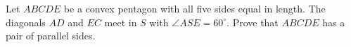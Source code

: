 Let $ABCDE$ be a convex pentagon with all five sides equal in length. The diagonals $AD$ and $EC$ meet in $S$ with $\angle ASE = 60^\circ$. Prove that $ABCDE$ has a pair of parallel sides.